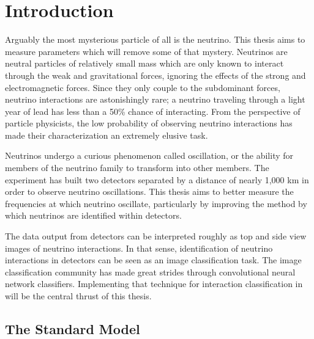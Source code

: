 \chapter{Introduction}
\label{intro_chapter}


Arguably the most mysterious particle of all is the neutrino.
This thesis aims to measure parameters which will remove some of that mystery.
Neutrinos are neutral particles of relatively small mass which are only
known to interact through the weak and gravitational forces, ignoring the
effects of the strong and electromagnetic forces.
Since they only couple to the subdominant forces, neutrino interactions are astonishingly rare; a neutrino traveling through a light year of lead has less than a 50\% chance of interacting.  From the perspective of particle physicists, the low probability of observing neutrino interactions has made their characterization an extremely elusive task.

Neutrinos undergo a curious phenomenon called oscillation, or the ability for members of the neutrino family to transform into other members.  The \nova experiment has built two detectors separated by a distance of nearly 1,000 km in order to observe neutrino oscillations.  This thesis aims to better measure the frequencies at which neutrino oscillate, particularly by improving the method by which neutrinos are identified within \nova detectors.

The data output from \nova detectors can be interpreted roughly as top and side view images of neutrino interactions.  In that sense, identification of neutrino interactions in \nova detectors can be seen as an image classification task.  The image classification community has made great strides through convolutional neural network classifiers.  Implementing that technique for interaction classification in \nova will be the central thrust of this thesis.


\section{The Standard Model}

